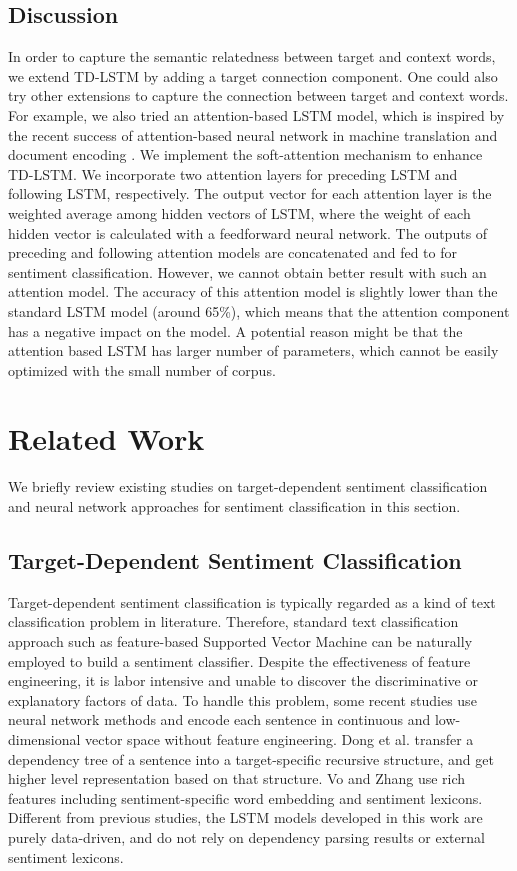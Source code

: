 \documentclass[11pt]{article}
\begin{document}
\subsection{Discussion}
In order to capture the semantic relatedness between target and context words, we extend TD-LSTM by adding a target connection component. One could also try other extensions to capture the connection between target and context words. For example, we also tried an attention-based LSTM model, which is inspired by the recent success of attention-based neural network in machine
translation \cite{Bahdanau2015} and document encoding \cite{Li2015}. 
We implement the soft-attention mechanism \cite{Bahdanau2015} to enhance TD-LSTM.
We incorporate two attention layers for preceding LSTM and following LSTM, respectively.
The output vector for each attention layer is the weighted average among hidden vectors of LSTM, 
where the weight of each hidden vector is calculated with a feedforward neural network.
The outputs of preceding and following attention models are concatenated and fed to  for sentiment classification.
However, we cannot obtain better result with such an attention model. The accuracy of this attention model is slightly lower than the standard LSTM model (around 65\%), which means that the attention component has a negative impact on the model. 
A potential reason might be that the attention based LSTM has larger number of parameters, which cannot be easily optimized with the small number of corpus. 


\section{Related Work}
We briefly review existing studies on target-dependent sentiment classification and neural network approaches for sentiment classification in this section. 

\subsection{Target-Dependent Sentiment Classification}


Target-dependent sentiment classification is typically regarded as a kind of text classification problem in literature.
Therefore, standard text classification approach such as feature-based Supported Vector Machine \cite{Pang2002,Jiang2011} can be naturally employed to build a sentiment classifier.
Despite the effectiveness of feature engineering, it is labor intensive and unable to discover the discriminative or explanatory factors of data. 
To handle this problem, some recent studies \cite{Dong2014a,Vo2015} use neural network methods and encode each sentence in continuous and low-dimensional vector space without feature engineering. 
Dong et al.  transfer a dependency tree of a sentence into a target-specific recursive structure, and get higher level representation based on that structure.
Vo and Zhang  use rich features including sentiment-specific word embedding and sentiment lexicons.
Different from previous studies, the LSTM models developed in this work are purely data-driven, and do not rely on dependency parsing results or external sentiment lexicons. 
\end{document}

